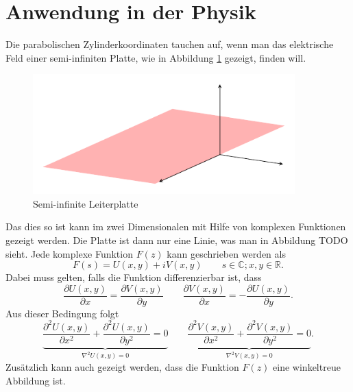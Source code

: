 %
%
%
\section{Anwendung in der Physik 
\label{parzyl:section:teil2}}

Die parabolischen Zylinderkoordinaten tauchen auf, wenn man das elektrische Feld einer semi-infiniten Platte, wie in Abbildung \ref{parzyl:fig:leiterplatte} gezeigt, finden will.
\begin{figure}
	 \centering
	\includegraphics[width=0.9\textwidth]{papers/parzyl/img/plane.pdf}
	\caption{Semi-infinite Leiterplatte}
	\label{parzyl:fig:leiterplatte}
\end{figure}
Das dies so ist kann im zwei Dimensionalen mit Hilfe von komplexen Funktionen gezeigt werden. Die Platte ist dann nur eine Linie, was man in Abbildung TODO sieht.
Jede komplexe Funktion $F(z)$ kann geschrieben werden als
\begin{equation}
	F(s) = U(x,y) + iV(x,y) \qquad s \in \mathbb{C}; x,y \in \mathbb{R}.
\end{equation}  
Dabei muss gelten, falls die Funktion differenzierbar ist, dass
\begin{equation}
	\frac{\partial U(x,y)}{\partial x} 
	=
	\frac{\partial V(x,y)}{\partial y} 
	\qquad
	\frac{\partial V(x,y)}{\partial x}
	=
	-\frac{\partial U(x,y)}{\partial y}.
\end{equation}
Aus dieser Bedingung folgt 
\begin{equation}
	\label{parzyl_e_feld_zweite_ab}
	\underbrace{
	\frac{\partial^2 U(x,y)}{\partial x^2}
	+ 
	\frac{\partial^2 U(x,y)}{\partial y^2}
	=
	0
	}_{\displaystyle{\nabla^2U(x,y)=0}}
	\qquad
	\underbrace{
	\frac{\partial^2 V(x,y)}{\partial x^2}
	+
	\frac{\partial^2 V(x,y)}{\partial y^2}
	=
	0
	}_{\displaystyle{\nabla^2V(x,y) = 0}}.
\end{equation}
Zusätzlich kann auch gezeigt werden, dass die Funktion $F(z)$ eine winkeltreue Abbildung ist. 
